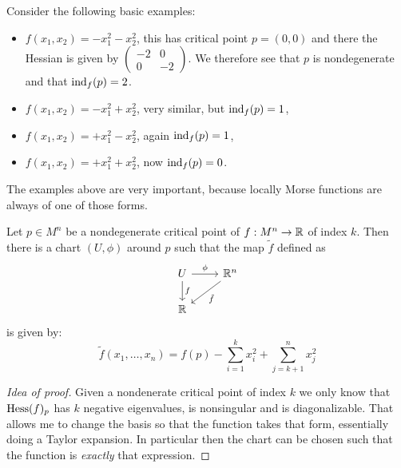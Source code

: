 \begin{ex}\label{ex:quadric}
    Consider the following basic examples: %
    \begin{itemize}
        \item $f(x_1, x_2) = -x_1^2-x_2^2$, this has critical point $p=(0,0)$ and there the Hessian is given by
        $\begin{pmatrix}
            -2 & 0 \\
            0 & -2 
        \end{pmatrix}$. We therefore see that $p$ is nondegenerate and that $\operatorname{ind}_f (p) = 2$.
        \item $f(x_1, x_2) = -x_1^2+x_2^2$, very similar, but $\operatorname{ind}_f (p) = 1$,
        \item $f(x_1, x_2) = +x_1^2-x_2^2$, again $\operatorname{ind}_f (p) = 1$,
        \item $f(x_1, x_2) = +x_1^2+x_2^2$, now $\operatorname{ind}_f (p) = 0$.
    \end{itemize}
\end{ex}

\noindent The examples above are very important, because locally Morse functions are always of one of those forms.
\begin{lem}
    Let $p \in M^n$ be a nondegenerate critical point of $f: M^n \to \mathbb{R}$ of index $k$. Then there is a chart $(U, \phi)$ around $p$ such that the map $\tilde f$ defined as
    \begin{equation}
        \begin{tikzcd}
            U \ar[r, "\phi"] \ar[d, "f"]& \R^n \ar[dl, "\tilde f"] \\
            \R
        \end{tikzcd}
    \end{equation}
    is given by:
    \begin{equation}
        \tilde f (x_1, \dots, x_n) = f(p) - \sum_{i=1}^k x_i^2 + \sum_{j=k+1}^n x_j^2
    \end{equation}
\end{lem}

\begin{proof}[Idea of proof]
    Given a nondenerate critical point of index $k$ we only know that $\operatorname{Hess}(f)_p$ has $k$ negative eigenvalues, is nonsingular and is diagonalizable. That allows me to change the basis so that the function takes that form, essentially doing a Taylor expansion. In particular then the chart can be chosen such that the function is \textit{exactly} that expression.
\end{proof}

